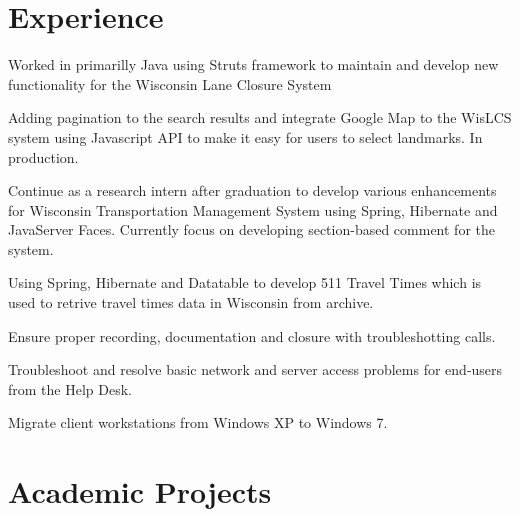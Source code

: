 \documentclass[]{deedy-resume-openfont}
\begin{document}
\begin{minipage}[t]{0.67\textwidth} 


\section{Experience}

\vspace{\topsep} %
\begin{tightemize}
\item Worked in primarilly Java using Struts framework to maintain and develop new functionality for the Wisconsin Lane Closure System
\item Adding pagination to the search results and integrate Google Map to the WisLCS system using Javascript API to make it easy for users to select landmarks. In production.
\item Continue as a research intern after graduation to develop various enhancements for Wisconsin Transportation Management System using Spring, Hibernate and JavaServer Faces. Currently focus on developing section-based comment for the system.
\item Using Spring, Hibernate and Datatable to develop 511 Travel Times which is used to retrive travel times data in Wisconsin from archive.
\end{tightemize}
\sectionsep

\begin{tightemize}
\item Ensure proper recording, documentation and closure with troubleshotting calls.
\item Troubleshoot and resolve basic network and server access problems for end-users from the Help Desk. 
\item Migrate client workstations from Windows XP to Windows 7.
\end{tightemize}
\sectionsep


\section{Academic Projects}


\end{minipage}
\end{document}
